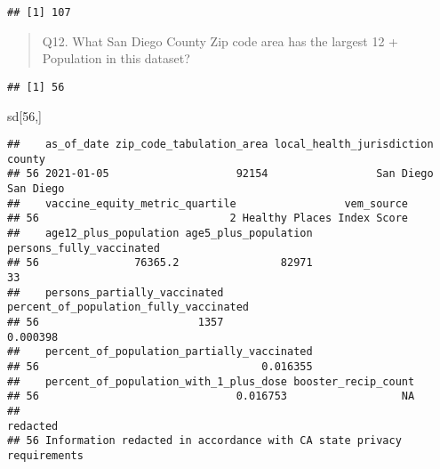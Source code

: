 \documentclass[
]{article}
\newenvironment{Shaded}{\begin{snugshade}}{\end{snugshade}}
\newcommand{\DecValTok}[1]{\textcolor[rgb]{0.00,0.00,0.81}{#1}}
\newcommand{\FunctionTok}[1]{\textcolor[rgb]{0.00,0.00,0.00}{#1}}
\newcommand{\NormalTok}[1]{#1}
\newcommand{\SpecialCharTok}[1]{\textcolor[rgb]{0.00,0.00,0.00}{#1}}
\begin{document}
\begin{Shaded}
\end{Shaded}

\begin{verbatim}
## [1] 107
\end{verbatim}

\begin{quote}
Q12. What San Diego County Zip code area has the largest 12 + Population
in this dataset?
\end{quote}

\begin{Shaded}
\end{Shaded}

\begin{verbatim}
## [1] 56
\end{verbatim}

\begin{Shaded}
\begin{Highlighting}[]
\NormalTok{sd[}\DecValTok{56}\NormalTok{,]}
\end{Highlighting}
\end{Shaded}

\begin{verbatim}
##    as_of_date zip_code_tabulation_area local_health_jurisdiction    county
## 56 2021-01-05                    92154                 San Diego San Diego
##    vaccine_equity_metric_quartile                 vem_source
## 56                              2 Healthy Places Index Score
##    age12_plus_population age5_plus_population persons_fully_vaccinated
## 56               76365.2                82971                       33
##    persons_partially_vaccinated percent_of_population_fully_vaccinated
## 56                         1357                               0.000398
##    percent_of_population_partially_vaccinated
## 56                                   0.016355
##    percent_of_population_with_1_plus_dose booster_recip_count
## 56                               0.016753                  NA
##                                                                 redacted
## 56 Information redacted in accordance with CA state privacy requirements
\end{verbatim}
\end{document}
